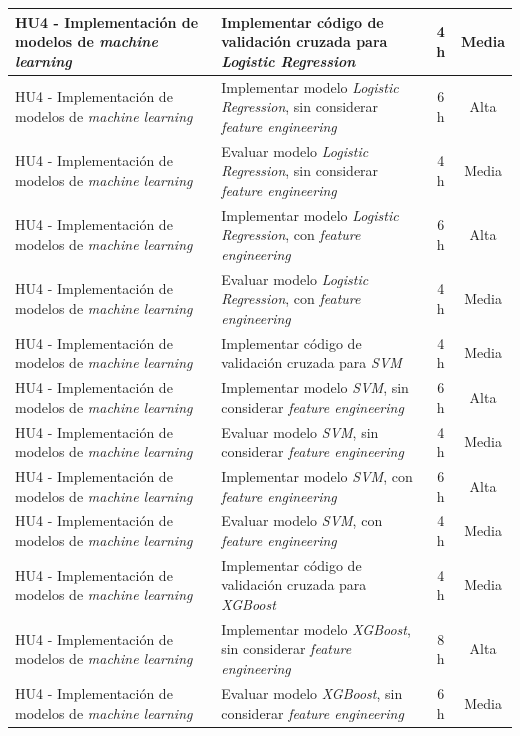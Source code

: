 \documentclass[
11pt, %
]{charter}
\begin{document}
\begin{xltabular}{\linewidth}{@{}|X|X|c|c|@{}}
HU4 - Implementación de modelos de \textit{machine learning} & Implementar código de validación cruzada para \textit{Logistic Regression} & 4 h & Media \\ \hline
HU4 - Implementación de modelos de \textit{machine learning} & Implementar modelo \textit{Logistic Regression}, sin considerar \textit{feature engineering} & 6 h & Alta \\ \hline
HU4 - Implementación de modelos de \textit{machine learning} & Evaluar modelo \textit{Logistic Regression}, sin considerar \textit{feature engineering} & 4 h & Media \\ \hline
HU4 - Implementación de modelos de \textit{machine learning} & Implementar modelo \textit{Logistic Regression}, con \textit{feature engineering} & 6 h & Alta \\ \hline
HU4 - Implementación de modelos de \textit{machine learning} & Evaluar modelo \textit{Logistic Regression}, con \textit{feature engineering} & 4 h & Media \\ \hline
HU4 - Implementación de modelos de \textit{machine learning} & Implementar código de validación cruzada para \textit{SVM} & 4 h & Media \\ \hline
HU4 - Implementación de modelos de \textit{machine learning} & Implementar modelo \textit{SVM}, sin considerar \textit{feature engineering} & 6 h & Alta \\ \hline
HU4 - Implementación de modelos de \textit{machine learning} & Evaluar modelo \textit{SVM}, sin considerar \textit{feature engineering} & 4 h & Media \\ \hline
HU4 - Implementación de modelos de \textit{machine learning} & Implementar modelo \textit{SVM}, con \textit{feature engineering} & 6 h & Alta \\ \hline
HU4 - Implementación de modelos de \textit{machine learning} & Evaluar modelo \textit{SVM}, con \textit{feature engineering} & 4 h & Media \\ \hline
HU4 - Implementación de modelos de \textit{machine learning} & Implementar código de validación cruzada para \textit{XGBoost} & 4 h & Media \\ \hline
HU4 - Implementación de modelos de \textit{machine learning} & Implementar modelo \textit{XGBoost}, sin considerar \textit{feature engineering} & 8 h & Alta \\ \hline
HU4 - Implementación de modelos de \textit{machine learning} & Evaluar modelo \textit{XGBoost}, sin considerar \textit{feature engineering} & 6 h & Media \\ \hline

\end{xltabular}
\end{document}
